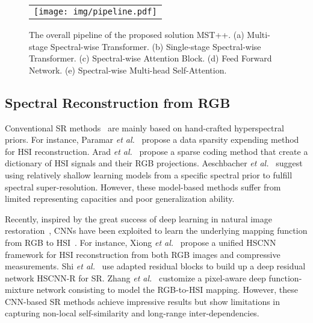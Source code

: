 \documentclass[10pt,twocolumn,letterpaper]{article}
\begin{document}
\begin{figure*}[t]
	\begin{center}
		\begin{tabular}[t]{c} \hspace{-3mm} 
			\texttt{[image: img/pipeline.pdf]}
		\end{tabular}
	\end{center}
\caption{\small The overall pipeline of the proposed solution MST++. (a) Multi-stage Spectral-wise Transformer. (b) Single-stage Spectral-wise Transformer. (c) Spectral-wise Attention Block. (d) Feed Forward Network. (e) Spectral-wise Multi-head Self-Attention.}
	\label{fig:pipeline}
\end{figure*}

\subsection{Spectral Reconstruction from RGB}
Conventional SR methods~\cite{tradi_1,tradi_2,tradi_3,tradi_4,parmar2008spatio} are mainly based on hand-crafted hyperspectral priors. For instance,  Paramar \emph{et al.}~\cite{parmar2008spatio} propose a data sparsity expending method for HSI reconstruction. Arad \emph{et al.}~\cite{tradi_2} propose a sparse coding method that create a dictionary of HSI signals and their RGB projections. Aeschbacher \emph{et al.}~\cite{tradi_1} suggest using relatively shallow learning models from a specific spectral prior to fulfill spectral super-resolution. However, these model-based methods suffer from limited representing capacities and poor generalization ability. 

Recently, inspired by the great success of deep learning in natural image restoration~\cite{huang2020unfolding,rformer,fgst,pngan,li2022general,li2022dfan,li2021approaching,rdn,msfn,poan}, CNNs have been exploited to learn the underlying mapping function from RGB to HSI~\cite{xiong2017hscnn,shi2018hscnn,zhang2020pixel,stiebel2018reconstructing,galliani2017learned}. For instance, Xiong \emph{et al.}~\cite{xiong2017hscnn} propose a unified HSCNN framework for HSI reconstruction from both RGB images and compressive measurements. Shi \emph{et al.}~\cite{shi2018hscnn} use adapted residual blocks to build up a deep residual network HSCNN-R for SR. Zhang \emph{et al.}~\cite{zhang2020pixel} customize a pixel-aware deep function-mixture network consisting to model the RGB-to-HSI mapping. However, these CNN-based SR methods achieve impressive results but show limitations in capturing non-local self-similarity and long-range inter-dependencies. 
\end{document}
